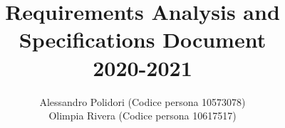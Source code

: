 \documentclass{article}
\title{ Requirements Analysis and Specifications Document\\2020-2021}
\author{Alessandro Polidori (Codice persona 10573078)\\Olimpia Rivera (Codice persona 10617517)}
\date{}
\begin{document}
\maketitle
\tableofcontents{}
\end{document}
